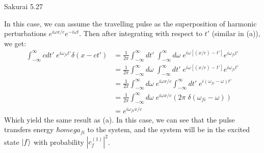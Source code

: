 \documentclass{article}
\begin{document}
\begin{section}{Sakurai 5.27}
\begin{enumerate}
	\begin{tcolorbox}[breakable]
		In this case, we can assume the travelling pulse as the superposition of harmonic perturbations $e^{i\omega x/c} e^{-i\omega t}$. Then after integrating with respect to $t'$ (similar in (a)), we get:
		\begin{align*}
			\int_{-\infty}^{\infty} cdt'\; e^{i\omega_{fi} t'} \delta(x - ct')
			 & = \frac{1}{2\pi} \int_{-\infty}^{\infty} dt'\; \int_{-\infty}^{\infty} d\omega\; e^{i\omega [(x/c) - t']} e^{i\omega_{fi} t'}    \\
			 & = \frac{1}{2\pi} \int_{-\infty}^{\infty} d\omega\; \int_{-\infty}^{\infty} dt'\; e^{i\omega [(x/c) - t']} e^{i\omega_{fi} t'}    \\
			 & = \frac{1}{2\pi} \int_{-\infty}^{\infty} d\omega\; e^{i\omega x/c} \int_{-\infty}^{\infty} dt'\; e^{i (\omega_{fi} - \omega) t'} \\
			 & = \frac{1}{2\pi} \int_{-\infty}^{\infty} d\omega\; e^{i\omega x/c} \left( 2\pi\; \delta(\omega_{fi} - \omega) \right)            \\
			 & = e^{i \omega_{fi} x/c}
		\end{align*}
		Which yield the same result as (a). In this case, we can see that the pulse transfers energy $\hbar omega_{fi}$ to the system, and the system will be in the excited state $\ket{f}$ with probability $\left|c_f^{(1)}\right|^2$.
	\end{tcolorbox}
\end{enumerate}

\end{section}
\end{document}
